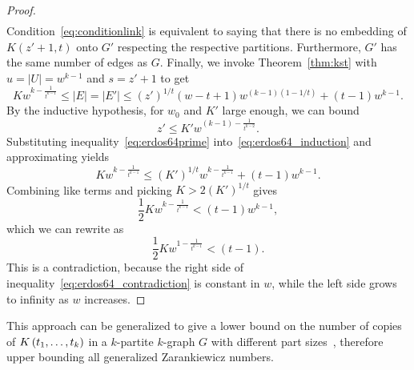 \begin{theorem}
\begin{proof}
\begin{align*}
        \end{align*}
        Condition~\eqref{eq:conditionlink} is equivalent to saying that
        there is no embedding of $K(z' + 1, t)$ onto $G'$ respecting the respective partitions.
        Furthermore, $G'$ has the same number of edges as $G$.
        Finally, we invoke Theorem~\ref{thm:kst} with
        ${u = |U| = w^{k-1}}$ and
        ${s = z' + 1}$ to get
        \begin{equation} \label{eq:erdos64_induction}
            K w^{k - \frac{1}{t^{k-1}}} \leq
            |E| = |E'| \leq
            (z')^{1 / t}(w - t + 1)w^{(k-1)(1 - 1 / t)} + (t - 1)w^{k-1}.
        \end{equation}
        By the inductive hypothesis, for $w_0$ and $K'$ large enough, we can bound
        \begin{equation} \label{eq:erdos64prime}
            z' \leq K' w^{(k - 1) - \frac{1}{t^{k-2}}}.
        \end{equation}
        Substituting inequality~\eqref{eq:erdos64prime} into~\eqref{eq:erdos64_induction} and approximating yields
        \[
            K w^{k - \frac{1}{t^{k-1}}} \leq (K')^{1 / t} w^{k-\frac{1}{t^{k-1}}} + (t - 1)w^{k-1}.
        \]
        Combining like terms and picking $K > 2 (K')^{1 / t}$ gives
        \[
            \frac{1}{2}K w^{k - \frac{1}{t^{k-1}}} < (t - 1)w^{k-1},
        \]
        which we can rewrite as
        \begin{equation} \label{eq:erdos64_contradiction}
            \frac{1}{2}Kw^{1 - \frac{1}{t^{k-1}}} < (t - 1).
        \end{equation}
        This is a contradiction, because the right side of inequality~\eqref{eq:erdos64_contradiction}
        is constant in $w$, while the left side grows to infinity as $w$ increases.
    \end{proof}
\end{theorem}

This approach can be generalized to give a lower bound on the number of
copies of $K\left(t_1, \dots, t_k\right)$ in a $k$-partite $k$-graph $G$
with different part sizes~\cite{carvajal2024canonical},
therefore upper bounding all generalized Zarankiewicz numbers.


